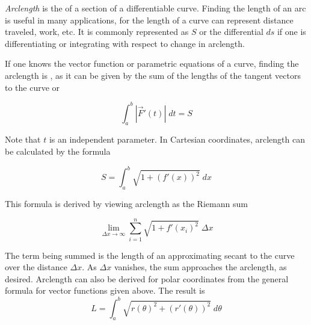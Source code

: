 \documentclass{article}
\begin{document}

\emph{Arclength} is the  of a section of a differentiable curve. Finding the length of an arc is useful in many applications, for the length of a curve can represent distance traveled, work, etc. It is commonly represented as $S$ or the differential $ds$ if one is differentiating or integrating with respect to change in arclength. 

If one knows the vector function or parametric equations of a curve, finding the arclength is , as it can be given by the sum of the lengths of the tangent vectors to the curve or 

$$ \int_a^b |\vec{F}'(t)| \; dt=S $$ 

Note that $t$ is an independent parameter. In Cartesian coordinates, arclength can be calculated by the formula 

$$ S=\int_a^b \sqrt{1+(f'(x))^2} \; dx $$ 

This formula is derived by viewing arclength as the Riemann sum 

$$ \lim_{\Delta x\rightarrow\infty}\sum_{i=1}^n \sqrt{1+f'(x_i)^2}\; \Delta x $$ 

The term being summed is the length of an approximating secant to the curve over the distance $\Delta x$. As $\Delta x$ vanishes, the sum approaches the arclength, as desired. Arclength can also be derived for polar coordinates from the general formula for vector functions given above. The result is
$$ L = \int_a^b \sqrt{r(\theta)^2 + (r'(\theta))^2}\; d\theta$$
\end{document}
